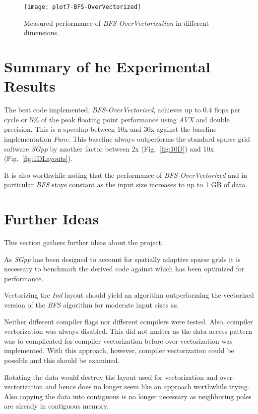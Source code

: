 \documentclass[letterpaper]{article}
\begin{document}
			\begin{figure}[htbp]\centering
				\texttt{[image: plot7-BFS-OverVectorized]}
				\caption{Measured performance of \emph{BFS-OverVectorization} in different dimensions.}
				\label{fig:BFSOver}
			\end{figure}





	\section{Summary of he Experimental Results}

	The best code implemented, \emph{BFS-OverVectorized}, achieves up to $0.4$ flops per cycle or 5\% of the peak floating point performance using \emph{AVX} and double precision. This is a speedup between 10x and 30x against the baseline implementation \emph{Func}. This baseline always outperforms the standard sparse grid software \emph{SGpp} by another factor between 2x  (Fig.~\ref{fig:10D}) and 10x (Fig.~\ref{fig:1DLayouts}).

	It is also worthwhile noting that the performance of \emph{BFS-OverVectorized} and in particular \emph{BFS} stays constant as the input size increases to up to 1 GB of data.






	
	\section{Further Ideas}
		This section gathers further ideas about the project.
		
		As \emph{SGpp} has been designed to account for spatially adaptive sparse grids it is necessary to benchmark the derived code against \cite{buse12non-static} which has been optimized for performance.

		Vectorizing the \emph{Ind} layout should yield an algorithm outperforming the vectorized version of the \emph{BFS} algorithm for moderate input sizes as.

		Neither different compiler flags nor different compilers were tested. Also, compiler vectorization was always disabled. This did not matter as the data access pattern was to complicated for compiler vectorization before over-vectorization was implemented. With this approach, however, compiler vectorization could be possible and this should be examined. 

		Rotating the data would destroy the layout used for vectorization and over-vectorization and hence does no longer seem like an approach worthwhile trying. Also copying the data into contiguous is no longer necessary as neighboring poles are already in contiguous memory.




	


	
\end{document}
